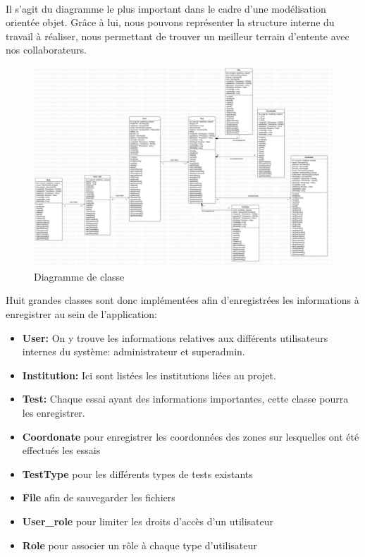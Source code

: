     \paragraph{}
    Il s'agit du diagramme le plus important dans le cadre 
    d'une modélisation orientée objet. Grâce à lui, nous pouvons
    représenter la structure interne du travail à réaliser, nous 
    permettant de trouver un meilleur terrain d'entente avec nos collaborateurs.
    \par 
    \begin{figure}[t]
        \centering
        \includegraphics[width=1\textwidth]{images/Analyse_des_besoins/ClassDiagram.png}
        \caption{Diagramme de classe}
        \label{fig:ClassDiagram}
    \end{figure}
    Huit grandes classes sont donc implémentées afin d'enregistrées les informations à enregistrer 
    au sein de l'application:
    \begin{itemize}
        \item \textbf{User:} On y trouve les informations relatives 
        aux différents utilisateurs internes du système: administrateur 
        et superadmin.
        \item \textbf{Institution:} Ici sont listées les institutions liées au projet.
        \item \textbf{Test:} Chaque essai ayant des informations importantes, cette classe pourra 
        les enregistrer.
        \item \textbf{Coordonate} pour enregistrer les coordonnées des zones sur lesquelles ont été effectués les essais
        \item \textbf{TestType} pour les différents types de tests existants
        \item \textbf{File} afin de sauvegarder les fichiers 
        \item \textbf{User\_role} pour limiter les droits d'accès d'un utilisateur 
        \item \textbf{Role} pour associer un rôle à chaque type d'utilisateur
    \end{itemize}
    \par 

